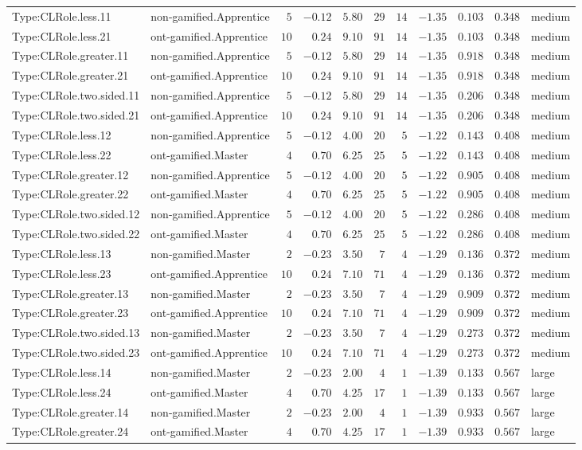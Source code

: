 \documentclass[6pt,a4paper]{article}
\begin{document}
{\begin{longtable}{llrrrrrrrrl}
Type:CLRole.less.11&non-gamified.Apprentice&$ 5$&$-0.12$&$ 5.80$&$ 29$&$14$&$-1.35$&$0.103$&$0.348$&medium\tabularnewline
Type:CLRole.less.21&ont-gamified.Apprentice&$10$&$ 0.24$&$ 9.10$&$ 91$&$14$&$-1.35$&$0.103$&$0.348$&medium\tabularnewline
Type:CLRole.greater.11&non-gamified.Apprentice&$ 5$&$-0.12$&$ 5.80$&$ 29$&$14$&$-1.35$&$0.918$&$0.348$&medium\tabularnewline
Type:CLRole.greater.21&ont-gamified.Apprentice&$10$&$ 0.24$&$ 9.10$&$ 91$&$14$&$-1.35$&$0.918$&$0.348$&medium\tabularnewline
Type:CLRole.two.sided.11&non-gamified.Apprentice&$ 5$&$-0.12$&$ 5.80$&$ 29$&$14$&$-1.35$&$0.206$&$0.348$&medium\tabularnewline
Type:CLRole.two.sided.21&ont-gamified.Apprentice&$10$&$ 0.24$&$ 9.10$&$ 91$&$14$&$-1.35$&$0.206$&$0.348$&medium\tabularnewline
Type:CLRole.less.12&non-gamified.Apprentice&$ 5$&$-0.12$&$ 4.00$&$ 20$&$ 5$&$-1.22$&$0.143$&$0.408$&medium\tabularnewline
Type:CLRole.less.22&ont-gamified.Master&$ 4$&$ 0.70$&$ 6.25$&$ 25$&$ 5$&$-1.22$&$0.143$&$0.408$&medium\tabularnewline
Type:CLRole.greater.12&non-gamified.Apprentice&$ 5$&$-0.12$&$ 4.00$&$ 20$&$ 5$&$-1.22$&$0.905$&$0.408$&medium\tabularnewline
Type:CLRole.greater.22&ont-gamified.Master&$ 4$&$ 0.70$&$ 6.25$&$ 25$&$ 5$&$-1.22$&$0.905$&$0.408$&medium\tabularnewline
Type:CLRole.two.sided.12&non-gamified.Apprentice&$ 5$&$-0.12$&$ 4.00$&$ 20$&$ 5$&$-1.22$&$0.286$&$0.408$&medium\tabularnewline
Type:CLRole.two.sided.22&ont-gamified.Master&$ 4$&$ 0.70$&$ 6.25$&$ 25$&$ 5$&$-1.22$&$0.286$&$0.408$&medium\tabularnewline
Type:CLRole.less.13&non-gamified.Master&$ 2$&$-0.23$&$ 3.50$&$  7$&$ 4$&$-1.29$&$0.136$&$0.372$&medium\tabularnewline
Type:CLRole.less.23&ont-gamified.Apprentice&$10$&$ 0.24$&$ 7.10$&$ 71$&$ 4$&$-1.29$&$0.136$&$0.372$&medium\tabularnewline
Type:CLRole.greater.13&non-gamified.Master&$ 2$&$-0.23$&$ 3.50$&$  7$&$ 4$&$-1.29$&$0.909$&$0.372$&medium\tabularnewline
Type:CLRole.greater.23&ont-gamified.Apprentice&$10$&$ 0.24$&$ 7.10$&$ 71$&$ 4$&$-1.29$&$0.909$&$0.372$&medium\tabularnewline
Type:CLRole.two.sided.13&non-gamified.Master&$ 2$&$-0.23$&$ 3.50$&$  7$&$ 4$&$-1.29$&$0.273$&$0.372$&medium\tabularnewline
Type:CLRole.two.sided.23&ont-gamified.Apprentice&$10$&$ 0.24$&$ 7.10$&$ 71$&$ 4$&$-1.29$&$0.273$&$0.372$&medium\tabularnewline
Type:CLRole.less.14&non-gamified.Master&$ 2$&$-0.23$&$ 2.00$&$  4$&$ 1$&$-1.39$&$0.133$&$0.567$&large\tabularnewline
Type:CLRole.less.24&ont-gamified.Master&$ 4$&$ 0.70$&$ 4.25$&$ 17$&$ 1$&$-1.39$&$0.133$&$0.567$&large\tabularnewline
Type:CLRole.greater.14&non-gamified.Master&$ 2$&$-0.23$&$ 2.00$&$  4$&$ 1$&$-1.39$&$0.933$&$0.567$&large\tabularnewline
Type:CLRole.greater.24&ont-gamified.Master&$ 4$&$ 0.70$&$ 4.25$&$ 17$&$ 1$&$-1.39$&$0.933$&$0.567$&large\tabularnewline

\end{longtable}}
\end{document}
